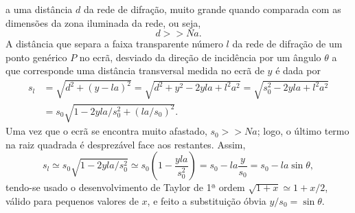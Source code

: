 a uma distância $d$ da rede de difração, muito grande quando comparada com as
dimensões da zona iluminada da rede, ou seja,
\begin{equation*}
d>>Na.
\end{equation*}
A distância que separa a faixa transparente número $l$ da rede de difração de um
ponto genérico $P$ no ecrã, desviado da direção de incidência por um ângulo
$\theta$ a que corresponde uma distância transversal medida no ecrã de $y$ é dada
por
\begin{align*}
s_l&=\sqrt{d^2+(y-la)^2}=\sqrt{d^2+y^2-2yla+l^2a^2}=
  \sqrt{s_0^2-2yla+l^2a^2}\\
  &=s_0\sqrt{1-2yla/s_0^2+(la/s_0)^2}.
\end{align*}
Uma vez que o ecrã se encontra muito afastado, $s_0>>Na$; logo, o último termo na
raiz quadrada é desprezável face aos restantes. Assim,
\begin{equation}\label{eq:gratdist}
s_l\simeq s_0\sqrt{1-2yla/s_0^2}\simeq s_0\left(1-\frac{yla}{s_0^2}\right)=
    s_0-la\frac{y}{s_0}=s_0-la\sin\theta,
\end{equation}
tendo-se usado o desenvolvimento de Taylor de 1ª ordem $\sqrt{1+x}\simeq1+x/2$,
válido para pequenos valores de $x$, e feito a substituição óbvia
$y/s_0=\sin\theta$.

